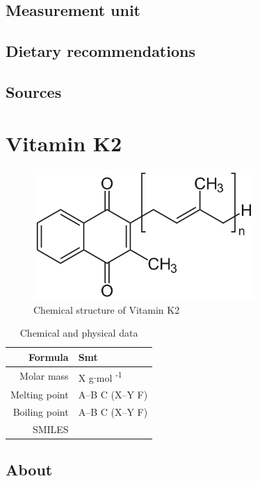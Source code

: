 \documentclass{book}
\begin{document}
\section{Measurement unit}


\section{Dietary recommendations}


\section{Sources}


\chapter{Vitamin K2}
\begin{figure}[h]
	\caption{Chemical structure of Vitamin K2}
	\centering \includegraphics[width=0.75\textwidth]{images/Vitamin_K2_chemical_structure}
\end{figure}

\begin{table}[h]
	\caption{Chemical and physical data}
	\centering \begin{tabular}{| r | l |}
		\hline
		Formula & Smt\\ \hline
		Molar mass & X g$\cdot$mol \textsuperscript{-1}\\ \hline
		Melting point & A--B \degree C (X--Y \degree F)\\ \hline
		Boiling point & A--B \degree C (X--Y \degree F)\\ \hline
		SMILES & \\ \hline
	\end{tabular}
\end{table}
\newpage

\section{About}
\end{document}
